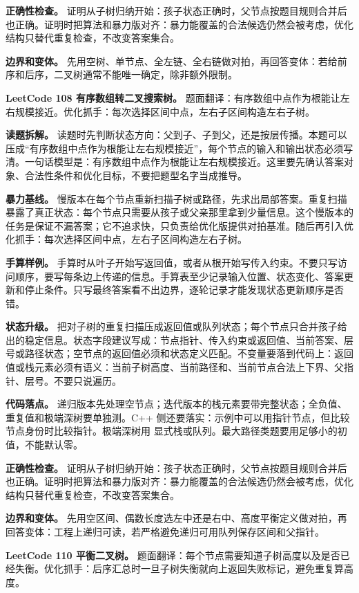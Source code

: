 \textbf{正确性检查。} 证明从子树归纳开始：孩子状态正确时，父节点按题目规则合并后也正确。证明时把算法和暴力版对齐：暴力能覆盖的合法候选仍然会被考虑，优化结构只替代重复检查，不改变答案集合。

\textbf{边界和变体。} 先用空树、单节点、全左链、全右链做对拍，再回答变体：若给前序和后序，二叉树通常不能唯一确定，除非额外限制。

\noindent\textbf{LeetCode 108 有序数组转二叉搜索树。} 题面翻译：有序数组中点作为根能让左右规模接近。优化抓手：每次选择区间中点，左右子区间构造左右子树。

\textbf{读题拆解。} 读题时先判断状态方向：父到子、子到父，还是按层传播。本题可以压成“有序数组中点作为根能让左右规模接近”，每个节点的输入和输出状态必须写清。一句话模型是：有序数组中点作为根能让左右规模接近。这里要先确认答案对象、合法性条件和优化目标，不要把题型名字当成推导。

\textbf{暴力基线。} 慢版本在每个节点重新扫描子树或路径，先求出局部答案。重复扫描暴露了真正状态：每个节点只需要从孩子或父亲那里拿到少量信息。这个慢版本的任务是保证不漏答案；它不追求快，只负责给优化版提供对拍基准。随后再引入优化抓手：每次选择区间中点，左右子区间构造左右子树。

\textbf{手算样例。} 手算时从叶子开始写返回值，或者从根开始写传入约束。不要只写访问顺序，要写每条边上传递的信息。手算表至少记录输入位置、状态变化、答案更新和停止条件。只写最终答案看不出边界，逐轮记录才能发现状态更新顺序是否错。

\textbf{状态升级。} 把对子树的重复扫描压成返回值或队列状态；每个节点只合并孩子给出的稳定信息。状态字段建议写成：节点指针、传入约束或返回值、当前答案、层号或路径状态；空节点的返回值必须和状态定义匹配。不变量要落到代码上：返回值或栈元素必须有语义：当前子树高度、当前路径和、当前节点合法上下界、父指针、层号。不要只说遍历。

\textbf{代码落点。} 递归版本先处理空节点；迭代版本的栈元素要带完整状态；全负值、重复值和极端深树要单独测。C++ 侧还要落实：示例中可以用指针节点，但比较节点身份时比较指针。极端深树用  显式栈或队列。最大路径类题要用足够小的初值，不能默认零。

\textbf{正确性检查。} 证明从子树归纳开始：孩子状态正确时，父节点按题目规则合并后也正确。证明时把算法和暴力版对齐：暴力能覆盖的合法候选仍然会被考虑，优化结构只替代重复检查，不改变答案集合。

\textbf{边界和变体。} 先用空区间、偶数长度选左中还是右中、高度平衡定义做对拍，再回答变体：工程上递归可读，若严格避免递归可用队列保存区间和父指针。

\noindent\textbf{LeetCode 110 平衡二叉树。} 题面翻译：每个节点需要知道子树高度以及是否已经失衡。优化抓手：后序汇总时一旦子树失衡就向上返回失败标记，避免重复算高度。

